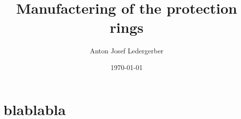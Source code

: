 \documentclass[11pt]{amsart}
\title{Manufactering of the protection rings}
\author{Anton Josef Ledergerber}
\date{\today}                                           %
\begin{document}
\maketitle

\section{blablabla}

\nocite{*}


\end{document}
